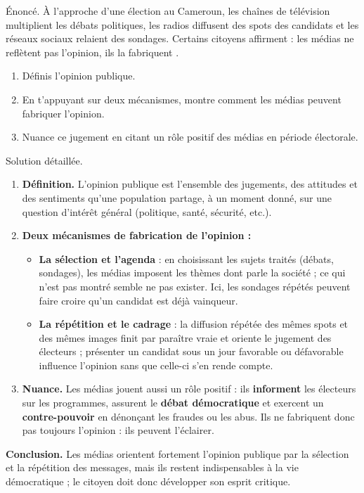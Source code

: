 \documentclass[11pt]{article}
\begin{document}
\begin{exoresolu}
Énoncé. À l'approche d'une élection au Cameroun, les chaînes de télévision multiplient les débats politiques, les radios diffusent des spots des candidats et les réseaux sociaux relaient des sondages. Certains citoyens affirment : \og les médias ne reflètent pas l'opinion, ils la fabriquent \fg.
\begin{enumerate}
\item Définis l'opinion publique.
\item En t'appuyant sur deux mécanismes, montre comment les médias peuvent \og fabriquer \fg{} l'opinion.
\item Nuance ce jugement en citant un rôle positif des médias en période électorale.
\end{enumerate}
\tcblower
Solution détaillée.
\begin{enumerate}
\item \textbf{Définition.} L'opinion publique est l'ensemble des jugements, des attitudes et des sentiments qu'une population partage, à un moment donné, sur une question d'intérêt général (politique, santé, sécurité, etc.).
\item \textbf{Deux mécanismes de fabrication de l'opinion :}
\begin{itemize}
\item \textbf{La sélection et l'agenda} : en choisissant les sujets traités (débats, sondages), les médias imposent les thèmes dont parle la société ; ce qui n'est pas montré semble ne pas exister. Ici, les sondages répétés peuvent faire croire qu'un candidat est déjà vainqueur.
\item \textbf{La répétition et le cadrage} : la diffusion répétée des mêmes spots et des mêmes images finit par paraître vraie et oriente le jugement des électeurs ; présenter un candidat sous un jour favorable ou défavorable influence l'opinion sans que celle-ci s'en rende compte.
\end{itemize}
\item \textbf{Nuance.} Les médias jouent aussi un rôle positif : ils \textbf{informent} les électeurs sur les programmes, assurent le \textbf{débat démocratique} et exercent un \textbf{contre-pouvoir} en dénonçant les fraudes ou les abus. Ils ne fabriquent donc pas toujours l'opinion : ils peuvent l'éclairer.
\end{enumerate}
\textbf{Conclusion.} Les médias orientent fortement l'opinion publique par la sélection et la répétition des messages, mais ils restent indispensables à la vie démocratique ; le citoyen doit donc développer son esprit critique.
\end{exoresolu}
\end{document}
